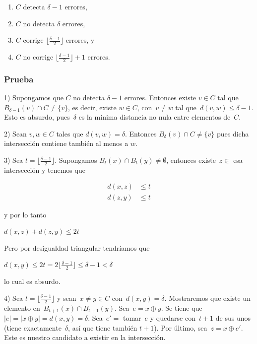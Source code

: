 \documentclass[10pt,a4paper]{article}
\begin{document}
\begin{enumerate}

	\item $C$ detecta $\delta-1$ errores,
	\item $C$ no detecta $\delta$ errores,
	\item $C$ corrige $\lfloor \frac{\delta - 1}{2}\rfloor$ errores, y
	\item $C$ no corrige $\lfloor \frac{\delta - 1}{2}\rfloor +1 $ errores.
\end{enumerate}

\subsubsection*{Prueba}

1) Supongamos que $C$ no detecta $\delta - 1 $ errores. Entonces existe $v \in C$ tal que $B_{\delta - 1} (v) \cap C \neq \{v\}$, es decir, existe $w \in C$, con $v \neq w$ tal que $d(v, w) \leq \delta - 1$. Esto es absurdo, pues $\delta$ es la mínima distancia no nula entre elementos de $C$.  

2) Sean $v, w \in C$ tales que $d(v, w) = \delta$. Entonces $B_\delta(v) \cap C \neq \{v\}$ pues dicha intersección contiene también al menos a $w$.

3) Sea $t = \lfloor \frac{\delta - 1}{2}\rfloor$. Supongamos $B_t(x) \cap B_t(y) \neq \emptyset$, entonces existe $z \in $ esa intersección y tenemos que

\begin{center}
\begin{align*} d(x, z) & \leq t\\ d(z, y) & \leq t \end{align*}
\end{center}

y por lo tanto

\begin{center}
$d(x, z) + d(z, y) \leq 2t$
\end{center}

Pero por desigualdad triangular tendríamos que

\begin{center}
$d(x, y) \leq 2 t = 2 \lfloor \frac{\delta - 1}{2}\rfloor \leq \delta - 1 < \delta$
\end{center}

lo cual es absurdo.

4) Sea $t = \lfloor \frac{\delta - 1}{2}\rfloor$ y sean $x \neq y \in C$ con $d(x, y) = \delta$. Mostraremos que existe un elemento en $B_{t + 1}(x) \cap B_{t + 1}(y)$. Sea $e = x \oplus y$. Se tiene que $\lvert e \rvert = \lvert x \oplus y \rvert = d(x, y) = \delta$. Sea $e' = $ tomar $e$ y quedarse con $t + 1$ de sus unos (tiene exactamente $\delta$, así que tiene también $t + 1$). Por último, sea $z = x \oplus e'$. Este es nuestro candidato a existir en la intersección.
\end{document}
